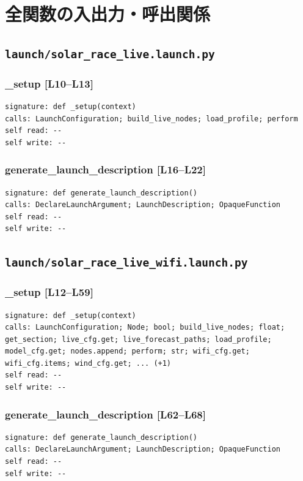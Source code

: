 \documentclass[a4paper,10pt,oneside]{book}
\begin{document}
\chapter{全関数の入出力・呼出関係}
\section{\texttt{launch/solar\_race\_live.launch.py}}
\subsection*{\_setup [L10--L13]}
\begin{lstlisting}[numbers=none]
signature: def _setup(context)
calls: LaunchConfiguration; build_live_nodes; load_profile; perform
self read: --
self write: --
\end{lstlisting}
\subsection*{generate\_launch\_description [L16--L22]}
\begin{lstlisting}[numbers=none]
signature: def generate_launch_description()
calls: DeclareLaunchArgument; LaunchDescription; OpaqueFunction
self read: --
self write: --
\end{lstlisting}
\section{\texttt{launch/solar\_race\_live\_wifi.launch.py}}
\subsection*{\_setup [L12--L59]}
\begin{lstlisting}[numbers=none]
signature: def _setup(context)
calls: LaunchConfiguration; Node; bool; build_live_nodes; float; get_section; live_cfg.get; live_forecast_paths; load_profile; model_cfg.get; nodes.append; perform; str; wifi_cfg.get; wifi_cfg.items; wind_cfg.get; ... (+1)
self read: --
self write: --
\end{lstlisting}
\subsection*{generate\_launch\_description [L62--L68]}
\begin{lstlisting}[numbers=none]
signature: def generate_launch_description()
calls: DeclareLaunchArgument; LaunchDescription; OpaqueFunction
self read: --
self write: --
\end{lstlisting}
\end{document}
